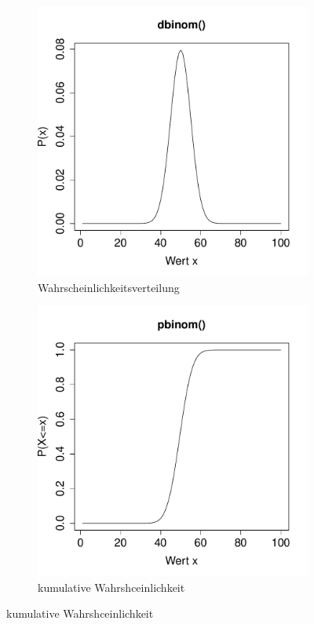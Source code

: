 \begin{figure}[h!]
\centering
\begin{subfigure}[b]{0.48\textwidth}
\includegraphics{verteilungen-018}
\caption{Wahrscheinlichkeitsverteilung}
\end{subfigure}
\begin{subfigure}[b]{0.48\textwidth}
\includegraphics{verteilungen-019}
\caption{kumulative Wahrshceinlichkeit}
\end{subfigure}


\end{figure}
